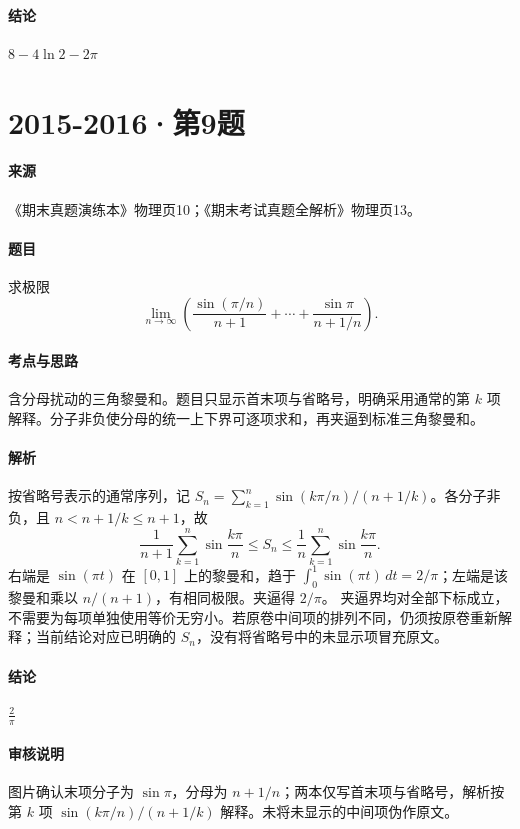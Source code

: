 \documentclass[UTF8,fontset=fandol,12pt,oneside,openany]{ctexrep}
\theoremstyle{definition}
\begin{document}
\paragraph{结论}
$8-4\ln2-2\pi$

\par\addvspace{18pt}\noindent\begin{minipage}{\linewidth}
\section{2015-2016·第9题}
\label{exam:11:q34}
\paragraph{来源} 《期末真题演练本》物理页10；《期末考试真题全解析》物理页13。
\paragraph{题目}
求极限 \[\lim_{n\to\infty}\left(\frac{\sin(\pi/n)}{n+1}+\cdots+\frac{\sin\pi}{n+1/n}\right).\]
\end{minipage}\par
\paragraph{考点与思路}
含分母扰动的三角黎曼和。题目只显示首末项与省略号，明确采用通常的第 $k$ 项解释。分子非负使分母的统一上下界可逐项求和，再夹逼到标准三角黎曼和。
\paragraph{解析}
按省略号表示的通常序列，记 $S_n=\sum_{k=1}^n\sin(k\pi/n)/(n+1/k)$。各分子非负，且 $n<n+1/k\le n+1$，故 \[\frac1{n+1}\sum_{k=1}^n\sin\frac{k\pi}n\le S_n\le\frac1n\sum_{k=1}^n\sin\frac{k\pi}n.\]右端是 $\sin(\pi t)$ 在 $[0,1]$ 上的黎曼和，趋于 $\int_0^1\sin(\pi t)\,dt=2/\pi$；左端是该黎曼和乘以 $n/(n+1)$，有相同极限。夹逼得 $2/\pi$。
夹逼界均对全部下标成立，不需要为每项单独使用等价无穷小。若原卷中间项的排列不同，仍须按原卷重新解释；当前结论对应已明确的 $S_n$，没有将省略号中的未显示项冒充原文。
\paragraph{结论}
$\frac2\pi$
\paragraph{审核说明}
图片确认末项分子为 $\sin\pi$，分母为 $n+1/n$；两本仅写首末项与省略号，解析按第 $k$ 项 $\sin(k\pi/n)/(n+1/k)$ 解释。未将未显示的中间项伪作原文。
\end{document}
